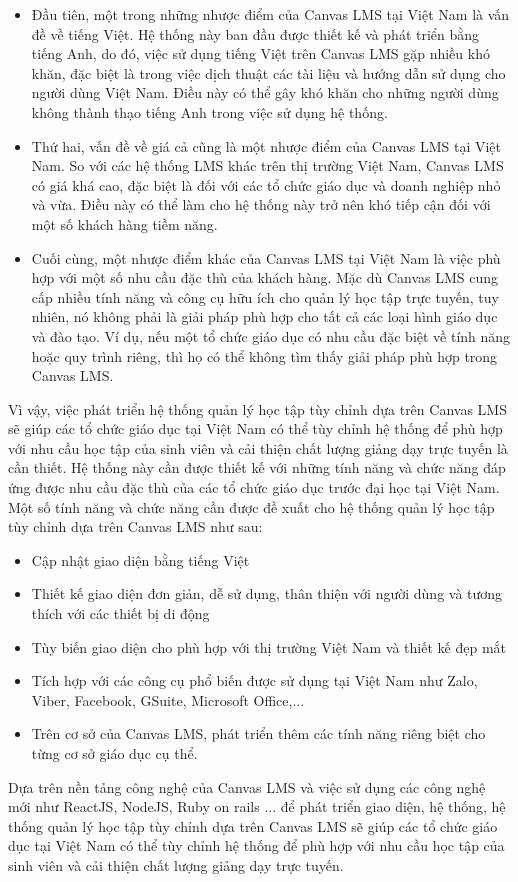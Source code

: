 \documentclass[../Thesis.tex]{subfiles}
\begin{document}
\begin{itemize}
    \item Đầu tiên, một trong những nhược điểm của Canvas LMS tại Việt Nam là vấn đề về tiếng Việt. Hệ thống này ban đầu được thiết kế và phát triển bằng tiếng Anh, do đó, việc sử dụng tiếng Việt trên Canvas LMS gặp nhiều khó khăn, đặc biệt là trong việc dịch thuật các tài liệu và hướng dẫn sử dụng cho người dùng Việt Nam. Điều này có thể gây khó khăn cho những người dùng không thành thạo tiếng Anh trong việc sử dụng hệ thống.
    \item Thứ hai, vấn đề về giá cả cũng là một nhược điểm của Canvas LMS tại Việt Nam. So với các hệ thống LMS khác trên thị trường Việt Nam, Canvas LMS có giá khá cao, đặc biệt là đối với các tổ chức giáo dục và doanh nghiệp nhỏ và vừa. Điều này có thể làm cho hệ thống này trở nên khó tiếp cận đối với một số khách hàng tiềm năng.
    \item Cuối cùng, một nhược điểm khác của Canvas LMS tại Việt Nam là việc phù hợp với một số nhu cầu đặc thù của khách hàng. Mặc dù Canvas LMS cung cấp nhiều tính năng và công cụ hữu ích cho quản lý học tập trực tuyến, tuy nhiên, nó không phải là giải pháp phù hợp cho tất cả các loại hình giáo dục và đào tạo. Ví dụ, nếu một tổ chức giáo dục có nhu cầu đặc biệt về tính năng hoặc quy trình riêng, thì họ có thể không tìm thấy giải pháp phù hợp trong Canvas LMS.
\end{itemize}

Vì vậy,  việc phát triển hệ thống quản lý học tập tùy chỉnh dựa trên Canvas LMS sẽ giúp các tổ chức giáo dục tại Việt Nam có thể tùy chỉnh hệ thống để phù hợp với nhu cầu học tập của sinh viên và cải thiện chất lượng giảng dạy trực tuyến là cần thiết. Hệ thống này cần được thiết kế với những tính năng và chức năng đáp ứng được nhu cầu đặc thù của các tổ chức giáo dục trước đại học tại Việt Nam. Một số tính năng và chức năng cần được đề xuất cho hệ thống quản lý học tập tùy chỉnh dựa trên Canvas LMS như sau:
\begin{itemize}
    \item Cập nhật giao diện bằng tiếng Việt
    \item Thiết kế giao diện đơn giản, dễ sử dụng, thân thiện với người dùng và tương thích với các thiết bị di động
    \item Tùy biến giao diện cho phù hợp với thị trường Việt Nam và thiết kế đẹp mắt
    \item Tích hợp với các công cụ phổ biến được sử dụng tại Việt Nam như Zalo, Viber, Facebook, GSuite, Microsoft Office,...
    \item Trên cơ sở của Canvas LMS, phát triển thêm các tính năng riêng biệt cho từng cơ sở giáo dục cụ thể.
\end{itemize}

Dựa trên nền tảng công nghệ của Canvas LMS và việc sử dụng các công nghệ mới như ReactJS, NodeJS, Ruby on rails ... để phát triển giao diện, hệ thống, hệ thống quản lý học tập tùy chỉnh dựa trên Canvas LMS sẽ giúp các tổ chức giáo dục tại Việt Nam có thể tùy chỉnh hệ thống để phù hợp với nhu cầu học tập của sinh viên và cải thiện chất lượng giảng dạy trực tuyến.
\end{document}
